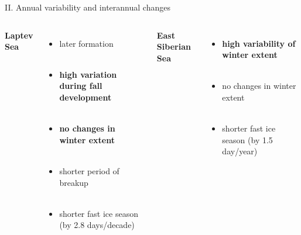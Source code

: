 \documentclass[8pt]{beamer}
\begin{document}
\setwatermark{\fontsize{125pt}{125pt}\selectfont{}}
\begin{frame}[fragile]{II. Annual variability and interannual changes}
\begin{columns}
	\centering
	\textbf{Laptev Sea}\\~\\
	\begin{itemize}
		\item later formation\\~\\
		\item \textbf{high variation during fall development}\\~\\
		\item \textbf{no changes in winter extent}\\~\\
		\item shorter period of breakup\\~\\
		\item shorter fast ice season (by 2.8 days/decade)\\~\\
	\end{itemize}
	
	\centering
	\textbf{East Siberian Sea}\\~\\
	\begin{itemize}
		\item \textbf{high variability of winter extent}\\~\\
		\item no changes in winter extent\\~\\
		\item shorter fast ice season (by 1.5 day/year) 
	\end{itemize}
\end{columns}
\end{frame}

\end{document}

